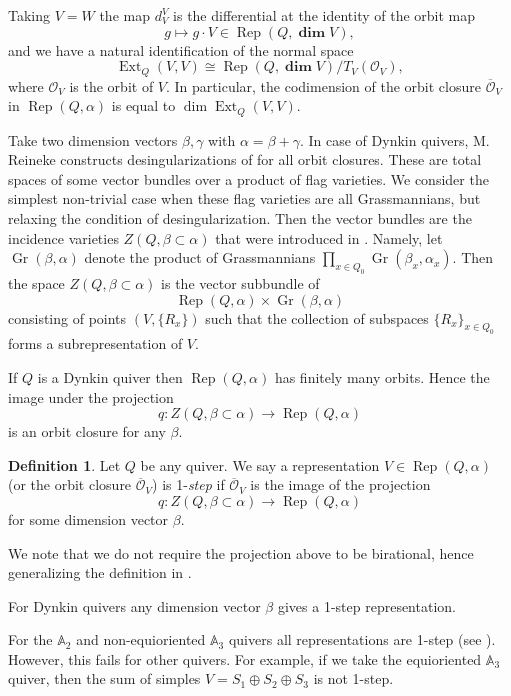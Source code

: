 \documentclass[twoside]{article}
\newcommand{\orb}{\mathcal{O}}
\newcommand{\op}{\operatorname}
\DeclareMathOperator{\Dim}{\mathbf{dim}}
\newcommand{\Ext}{\operatorname{Ext}}
\newcommand{\Rep}{\operatorname{Rep}}
\newcommand{\A}{\mathbb{A}}
\theoremstyle{definition}
\newtheorem{definition}[theorem]{Definition}
\begin{document}
Taking $V=W$ the map $d^V_V$ is the differential at the identity of the orbit map
$$g\mapsto g\cdot V \in \Rep(Q,\Dim V),$$
and we have a natural identification of the normal space
$$\Ext_Q(V,V)\cong \Rep(Q,\Dim V)/T_V(\mathcal{O}_V),$$
where $\mathcal{O}_V$ is the orbit of $V$. In particular, the codimension of the orbit closure $\overline{\orb}_V$ in $\Rep(Q,\alpha)$ is equal to $\dim \Ext_Q(V,V)$.

Take two dimension vectors $\beta,\gamma$ with $\alpha=\beta+\gamma$. In case of Dynkin quivers, M. Reineke \cite{reineke} constructs desingularizations of for all orbit closures. These are total spaces of some vector bundles over a product of flag varieties. We consider the simplest non-trivial case when these flag varieties are all Grassmannians, but relaxing the condition of desingularization. Then the vector bundles are the incidence varieties $Z(Q,\beta \subset \alpha)$ that were introduced in \cite{scho}. Namely, let $\op{Gr}(\beta,\alpha)$ denote the product of Grassmannians $\prod_{x\in Q_0} \op{Gr}(\beta_x,\alpha_x)$. Then the space $Z(Q,\beta \subset \alpha)$ is the vector subbundle of
$$\Rep(Q,\alpha)\times \op{Gr}(\beta,\alpha)$$
consisting of points $(V,\{R_x\})$ such that the collection of subspaces $\{R_x\}_{x\in Q_0}$ forms a subrepresentation of $V$. 

If $Q$ is a Dynkin quiver then $\Rep(Q,\alpha)$ has finitely many orbits. Hence the image under the projection
$$q: Z(Q,\beta \subset \alpha) \to \Rep(Q,\alpha)$$
is an orbit closure for any $\beta$.

\begin{definition}\label{def:step}
Let $Q$ be any quiver. We say a representation $V\in \Rep(Q,\alpha)$ (or the orbit closure $\overline{\orb}_V$) is 1-\textit{step} if  $\overline{\orb}_V$ is the image of the projection
$$q: Z(Q,\beta \subset \alpha) \to \Rep(Q,\alpha)$$
for some dimension vector $\beta$.
\end{definition}

We note that we do not require the projection above to be birational, hence generalizing the definition in \cite{kavita}. 

For Dynkin quivers any dimension vector $\beta$ gives a 1-step representation. 

For the $\A_2$ and non-equioriented $\A_3$ quivers all representations are 1-step (see \cite{kavita2}). However, this fails for other quivers. For example,  if we take the equioriented $\A_3$ quiver, then the sum of simples $V=S_1\oplus S_2 \oplus S_3$ is not 1-step.
\end{document}
